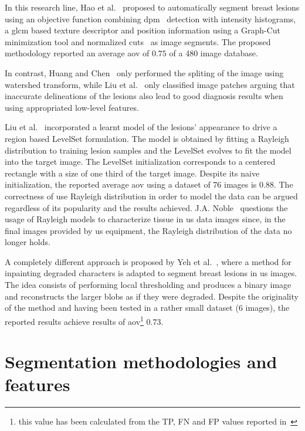 \documentclass[authoryear,preprint,review,12pt]{elsarticle}
\begin{document}
In this research line, Hao et al.~\cite{hao2012combining} proposed  to automatically segment breast lesions using an objective function combining \ac{dpm}~\cite{felzenszwalb2010object} detection with intensity histograms, a \ac{glcm} based texture descriptor and position information using a Graph-Cut minimization tool and normalized cuts~\cite{shi2000normalized} as image segments. The proposed methodology reported an average \ac{aov} of $0.75$ of a 480 image database.

In contrast, Huang and Chen~\cite{Huang:2004p2092} only performed the spliting of the image using watershed transform, while Liu et al.~\cite{Liu:2010p12036} only classified image patches arguing that inaccurate delineations of the lesions also lead to good diagnosis results when using appropriated low-level features.

Liu et al.~\cite{Liu:2010p14328} incorporated a learnt model of the lesions' appearance to drive a region based LevelSet formulation. The model is obtained by fitting a Rayleigh distribution to training lesion samples and the LevelSet evolves to fit the model into the target image. The LevelSet initialization corresponds to a centered rectangle with a size of one third of the target image. Despite its naive initialization, the reported average \ac{aov} using a dataset of 76 images is $0.88$. The correctness of use Rayleigh distribution in order to model the data can be argued regardless of its popularity and the results achieved. J.A. Noble~\cite{Noble:2009p14330} questions the usage of Rayleigh models to characterize tissue in \ac{us} data images since, in the final images provided by \ac{us} equipment, the Rayleigh distribution of the data no longer holds.

A completely different approach is proposed by Yeh et al.~\cite{Yeh:2009p11985}, where a method for inpainting degraded characters is adapted to segment breast lesions in \ac{us} images. The idea consists of performing local thresholding and produces a binary image and reconstructs the larger blobs as if they were degraded. Despite the originality of the method and having been tested in a rather small dataset (6 images), the reported results achieve results of \ac{aov}\footnote{this value has been calculated from the TP, FN and FP values reported in~\cite{Yeh:2009p11985}} $0.73$.

\section{Segmentation methodologies and features}\label{section:methodTypes}
\end{document}
